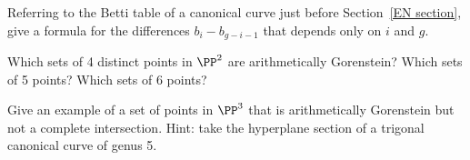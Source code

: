 \begin{exercise}
Referring to the Betti table of a canonical curve just before Section~\ref{EN section}, give a formula
for the differences $b_i- b_{g-i-1}$ that depends only on $i$ and $g$.
\end{exercise}


\begin{exercise}
Which sets of 4 distinct points in $\PP^2$ are arithmetically Gorenstein? Which sets of 5 points? Which sets of 6 points?
\end{exercise}

\begin{exercise}
 Give an example of a set of points in $\PP^3$ that is arithmetically Gorenstein but not a complete intersection. Hint: take the 
hyperplane section of a trigonal canonical curve of genus 5.
\end{exercise}

